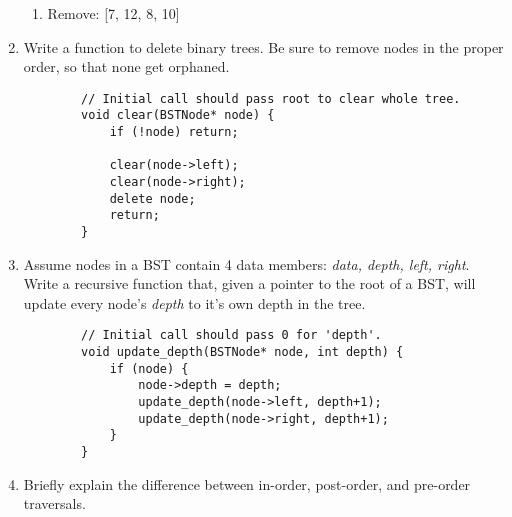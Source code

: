 \documentclass[11pt]{article}
\begin{document}
\begin{enumerate}
\begin{enumerate}
        \item Remove: [7, 12, 8, 10]
        
        \begin{center}
        \end{center}
    \end{enumerate}
    
    \newpage
    \item Write a function to delete binary trees. Be sure to remove nodes in the proper order, so that none get orphaned.

    \begin{verbatim}
        // Initial call should pass root to clear whole tree.
        void clear(BSTNode* node) {
            if (!node) return;
            
            clear(node->left);
            clear(node->right);
            delete node;
            return;
        }
    \end{verbatim}

    \item Assume nodes in a BST contain 4 data members: {\it data, depth, left, right}.  Write a recursive function that, given a pointer to the root of a BST, will update every node's {\it depth} to it's own depth in the tree.

    \begin{verbatim}
        // Initial call should pass 0 for 'depth'.
        void update_depth(BSTNode* node, int depth) {
            if (node) {
                node->depth = depth;
                update_depth(node->left, depth+1);
                update_depth(node->right, depth+1);
            }
        }
    \end{verbatim}

    \item Briefly explain the difference between in-order, post-order, and pre-order traversals.


\end{enumerate}
\end{document}
